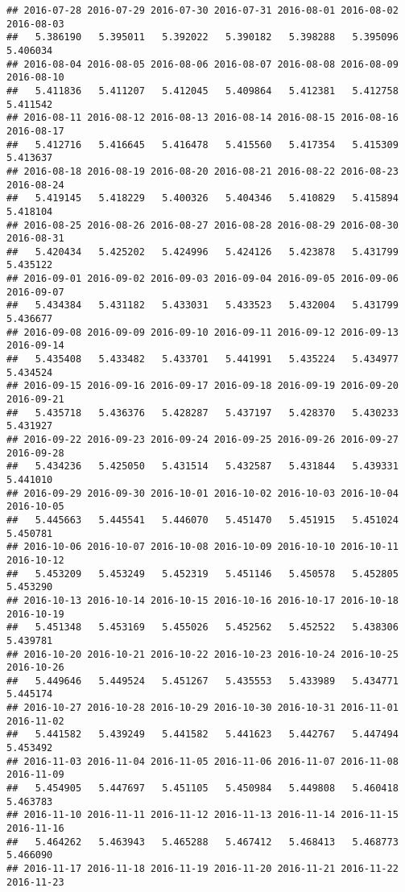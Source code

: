 \documentclass[
]{article}
\begin{document}
\begin{verbatim}
## 2016-07-28 2016-07-29 2016-07-30 2016-07-31 2016-08-01 2016-08-02 2016-08-03 
##   5.386190   5.395011   5.392022   5.390182   5.398288   5.395096   5.406034 
## 2016-08-04 2016-08-05 2016-08-06 2016-08-07 2016-08-08 2016-08-09 2016-08-10 
##   5.411836   5.411207   5.412045   5.409864   5.412381   5.412758   5.411542 
## 2016-08-11 2016-08-12 2016-08-13 2016-08-14 2016-08-15 2016-08-16 2016-08-17 
##   5.412716   5.416645   5.416478   5.415560   5.417354   5.415309   5.413637 
## 2016-08-18 2016-08-19 2016-08-20 2016-08-21 2016-08-22 2016-08-23 2016-08-24 
##   5.419145   5.418229   5.400326   5.404346   5.410829   5.415894   5.418104 
## 2016-08-25 2016-08-26 2016-08-27 2016-08-28 2016-08-29 2016-08-30 2016-08-31 
##   5.420434   5.425202   5.424996   5.424126   5.423878   5.431799   5.435122 
## 2016-09-01 2016-09-02 2016-09-03 2016-09-04 2016-09-05 2016-09-06 2016-09-07 
##   5.434384   5.431182   5.433031   5.433523   5.432004   5.431799   5.436677 
## 2016-09-08 2016-09-09 2016-09-10 2016-09-11 2016-09-12 2016-09-13 2016-09-14 
##   5.435408   5.433482   5.433701   5.441991   5.435224   5.434977   5.434524 
## 2016-09-15 2016-09-16 2016-09-17 2016-09-18 2016-09-19 2016-09-20 2016-09-21 
##   5.435718   5.436376   5.428287   5.437197   5.428370   5.430233   5.431927 
## 2016-09-22 2016-09-23 2016-09-24 2016-09-25 2016-09-26 2016-09-27 2016-09-28 
##   5.434236   5.425050   5.431514   5.432587   5.431844   5.439331   5.441010 
## 2016-09-29 2016-09-30 2016-10-01 2016-10-02 2016-10-03 2016-10-04 2016-10-05 
##   5.445663   5.445541   5.446070   5.451470   5.451915   5.451024   5.450781 
## 2016-10-06 2016-10-07 2016-10-08 2016-10-09 2016-10-10 2016-10-11 2016-10-12 
##   5.453209   5.453249   5.452319   5.451146   5.450578   5.452805   5.453290 
## 2016-10-13 2016-10-14 2016-10-15 2016-10-16 2016-10-17 2016-10-18 2016-10-19 
##   5.451348   5.453169   5.455026   5.452562   5.452522   5.438306   5.439781 
## 2016-10-20 2016-10-21 2016-10-22 2016-10-23 2016-10-24 2016-10-25 2016-10-26 
##   5.449646   5.449524   5.451267   5.435553   5.433989   5.434771   5.445174 
## 2016-10-27 2016-10-28 2016-10-29 2016-10-30 2016-10-31 2016-11-01 2016-11-02 
##   5.441582   5.439249   5.441582   5.441623   5.442767   5.447494   5.453492 
## 2016-11-03 2016-11-04 2016-11-05 2016-11-06 2016-11-07 2016-11-08 2016-11-09 
##   5.454905   5.447697   5.451105   5.450984   5.449808   5.460418   5.463783 
## 2016-11-10 2016-11-11 2016-11-12 2016-11-13 2016-11-14 2016-11-15 2016-11-16 
##   5.464262   5.463943   5.465288   5.467412   5.468413   5.468773   5.466090 
## 2016-11-17 2016-11-18 2016-11-19 2016-11-20 2016-11-21 2016-11-22 2016-11-23 

\end{verbatim}
\end{document}
